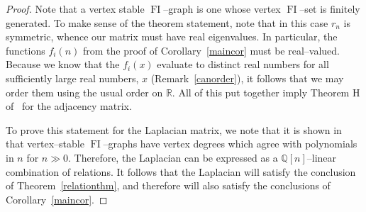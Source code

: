 \documentclass[ALCO,ThmDefs,Unicode,epreuves]{cedram}
\DeclareMathOperator{\FI}{FI}
\newcommand{\R}{\mathbb{R}}
\newcommand{\Q}{\mathbb{Q}}
\begin{document}
\begin{proof}
Note that a vertex stable $\FI$--graph is one whose vertex $\FI$--set is finitely generated. To make sense of the theorem statement, note that in this case $r_n$ is symmetric, whence our matrix must have real eigenvalues. In particular, the functions $f_i(n)$ from the proof of Corollary~\ref{maincor} must be real--valued. Because we know that the $f_i(x)$ evaluate to distinct real numbers for all sufficiently large real numbers, $x$ (Remark~\ref{canorder}), it follows that we may order them using the usual order on $\R$. All of this put together imply Theorem H of~\cite{RW} for the adjacency matrix.

To prove this statement for the Laplacian matrix, we note that it is shown in~\cite{RW} that vertex--stable $\FI$--graphs have vertex degrees which agree with polynomials in $n$ for $n \gg 0$. Therefore, the Laplacian can be expressed as a $\Q[n]$--linear combination of relations. It follows that the Laplacian will satisfy the conclusion of Theorem~\ref{relationthm}, and therefore will also satisfy the conclusions of Corollary~\ref{maincor}.
\end{proof}






\end{document}
